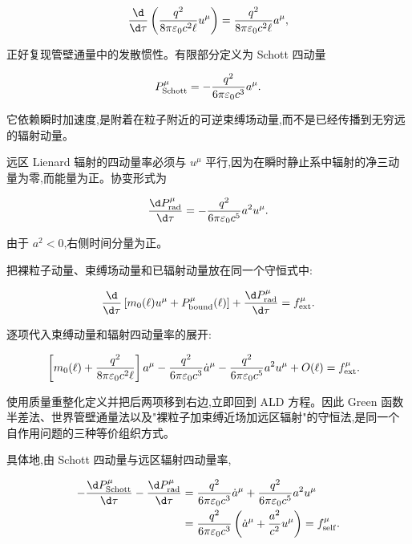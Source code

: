 \begin{equation*}
 {\d\over\d\tau}
 \left({q^2\over8\pi\varepsilon_0c^2\ell}u^\mu\right)
 ={q^2\over8\pi\varepsilon_0c^2\ell}a^\mu,
\end{equation*}

正好复现管壁通量中的发散惯性。有限部分定义为 Schott 四动量

\begin{equation*}
 P_{\mathrm{Schott}}^\mu
 =-{q^2\over6\pi\varepsilon_0c^3}a^\mu.
\end{equation*}

它依赖瞬时加速度,是附着在粒子附近的可逆束缚场动量,而不是已经传播到无穷远的辐射动量。

远区 Lienard 辐射的四动量率必须与 $u^\mu$ 平行,因为在瞬时静止系中辐射的净三动量为零,而能量为正。协变形式为

\begin{equation*}
 {\d P_{\mathrm{rad}}^\mu\over\d\tau}
 =-{q^2\over6\pi\varepsilon_0c^5}a^2u^\mu.
\end{equation*}

由于 $a^2<0$,右侧时间分量为正。

把裸粒子动量、束缚场动量和已辐射动量放在同一个守恒式中:

\begin{equation*}
 {\d\over\d\tau}
 \left[m_0(\ell)u^\mu
 +P_{\mathrm{bound}}^\mu(\ell)\right]
 +{\d P_{\mathrm{rad}}^\mu\over\d\tau}
 =f_{\mathrm{ext}}^\mu.
\end{equation*}

逐项代入束缚动量和辐射四动量率的展开:

\begin{align*}
 &\left[m_0(\ell)
 +{q^2\over8\pi\varepsilon_0c^2\ell}\right]a^\mu
 -{q^2\over6\pi\varepsilon_0c^3}\dot a^\mu
 -{q^2\over6\pi\varepsilon_0c^5}a^2u^\mu
 +O(\ell)
 =f_{\mathrm{ext}}^\mu.
\end{align*}

使用质量重整化定义并把后两项移到右边,立即回到 ALD 方程。因此 Green 函数半差法、世界管壁通量法以及"裸粒子加束缚近场加远区辐射"的守恒法,是同一个自作用问题的三种等价组织方式。

具体地,由 Schott 四动量与远区辐射四动量率,

\begin{align*}
 -{\d P_{\mathrm{Schott}}^\mu\over\d\tau}
 -{\d P_{\mathrm{rad}}^\mu\over\d\tau}
 &={q^2\over6\pi\varepsilon_0c^3}\dot a^\mu
 +{q^2\over6\pi\varepsilon_0c^5}a^2u^\mu\\
 &={q^2\over6\pi\varepsilon_0c^3}
 \left(\dot a^\mu+{a^2\over c^2}u^\mu\right)
 =f_{\mathrm{self}}^\mu.
\end{align*}

